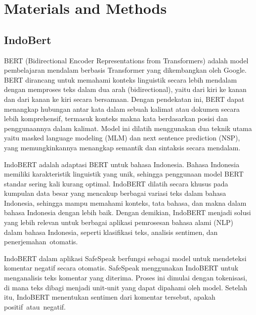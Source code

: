 \documentclass[journal,article,submit,pdftex,moreauthors]{Definitions/mdpi}
\begin{document}
\section{Materials and Methods}

\subsection {IndoBert}

\begin{adjustwidth}{2em}{0pt} 
\hspace{0.3cm} BERT (Bidirectional Encoder Representations from Transformers) adalah model pembelajaran mendalam berbasis Transformer yang dikembangkan oleh Google. BERT dirancang untuk memahami konteks linguistik secara lebih mendalam dengan memproses teks dalam dua arah (bidirectional), yaitu dari kiri ke kanan dan dari kanan ke kiri secara bersamaan. Dengan pendekatan ini, BERT dapat menangkap hubungan antar kata dalam sebuah kalimat atau dokumen secara lebih komprehensif, termasuk konteks makna kata berdasarkan posisi dan penggunaannya dalam kalimat. Model ini dilatih menggunakan dua teknik utama yaitu masked language modeling (MLM) dan next sentence prediction (NSP), yang memungkinkannya menangkap semantik dan sintaksis secara mendalam.

IndoBERT adalah adaptasi BERT untuk bahasa Indonesia. Bahasa Indonesia memiliki karakteristik linguistik yang unik, sehingga penggunaan model BERT standar sering kali kurang optimal. IndoBERT dilatih secara khusus pada kumpulan data besar yang mencakup berbagai variasi teks dalam bahasa Indonesia, sehingga mampu memahami konteks, tata bahasa, dan makna dalam bahasa Indonesia dengan lebih baik. Dengan demikian, IndoBERT menjadi solusi yang lebih relevan untuk berbagai aplikasi pemrosesan bahasa alami (NLP) dalam bahasa Indonesia, seperti klasifikasi teks, analisis sentimen, dan penerjemahan otomatis.

IndoBERT dalam aplikasi SafeSpeak berfungsi sebagai model untuk mendeteksi komentar negatif secara otomatis. SafeSpeak menggunakan IndoBERT untuk menganalisis teks komentar yang diterima. Proses ini dimulai dengan tokenisasi, di mana teks dibagi menjadi unit-unit yang dapat dipahami oleh model. Setelah itu, IndoBERT menentukan sentimen dari komentar tersebut, apakah positif atau negatif.
\end{adjustwidth}
\end{document}
